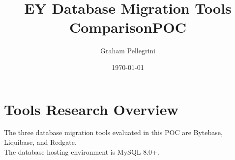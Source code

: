 \documentclass[11pt,a4paper]{article}
\title{\textbf{EY Database Migration Tools ComparisonPOC}}
\author{Graham Pellegrini}
\date{\today}
\begin{document}
\maketitle

\tableofcontents
\newpage

\section{Tools Research Overview}

The three database migration tools evaluated in this POC are Bytebase, Liquibase, and Redgate.\\
The database hosting environment is MySQL 8.0+.
\end{document}
